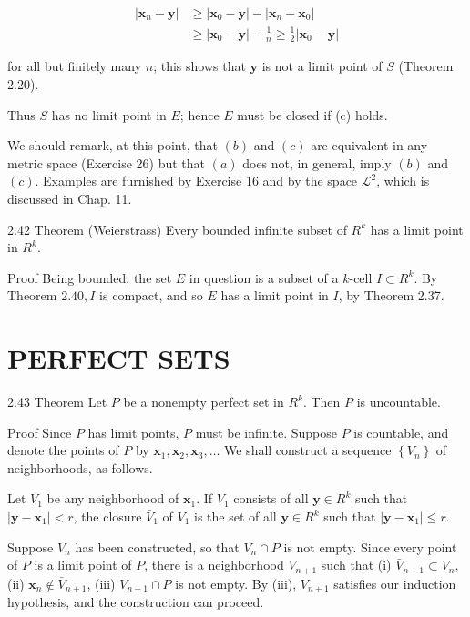 \documentclass[10pt]{article}
\begin{document}
$$
\begin{aligned}
\left|\mathbf{x}_{n}-\mathbf{y}\right| & \geq\left|\mathbf{x}_{0}-\mathbf{y}\right|-\left|\mathbf{x}_{n}-\mathbf{x}_{0}\right| \\
& \geq\left|\mathbf{x}_{0}-\mathbf{y}\right|-\frac{1}{n} \geq \frac{1}{2}\left|\mathbf{x}_{0}-\mathbf{y}\right|
\end{aligned}
$$

for all but finitely many $n$; this shows that $\mathbf{y}$ is not a limit point of $S$ (Theorem 2.20).

Thus $S$ has no limit point in $E$; hence $E$ must be closed if (c) holds.

We should remark, at this point, that $(b)$ and $(c)$ are equivalent in any metric space (Exercise 26) but that $(a)$ does not, in general, imply $(b)$ and $(c)$. Examples are furnished by Exercise 16 and by the space $\mathscr{L}^{2}$, which is discussed in Chap. 11.

2.42 Theorem (Weierstrass) Every bounded infinite subset of $R^{k}$ has a limit point in $R^{k}$.

Proof Being bounded, the set $E$ in question is a subset of a $k$-cell $I \subset R^{k}$. By Theorem $2.40, I$ is compact, and so $E$ has a limit point in $I$, by Theorem 2.37.

\section{PERFECT SETS}
2.43 Theorem Let $P$ be a nonempty perfect set in $R^{k}$. Then $P$ is uncountable.

Proof Since $P$ has limit points, $P$ must be infinite. Suppose $P$ is countable, and denote the points of $P$ by $\mathbf{x}_{1}, \mathbf{x}_{2}, \mathbf{x}_{3}, \ldots$ We shall construct a sequence $\left\{V_{n}\right\}$ of neighborhoods, as follows.

Let $V_{1}$ be any neighborhood of $\mathbf{x}_{1}$. If $V_{1}$ consists of all $\mathbf{y} \in R^{k}$ such that $\left|\mathbf{y}-\mathbf{x}_{1}\right|<r$, the closure $\bar{V}_{1}$ of $V_{1}$ is the set of all $\mathbf{y} \in R^{k}$ such that $\left|\mathbf{y}-\mathbf{x}_{1}\right| \leq r$.

Suppose $V_{n}$ has been constructed, so that $V_{n} \cap P$ is not empty. Since every point of $P$ is a limit point of $P$, there is a neighborhood $V_{n+1}$ such that (i) $\bar{V}_{n+1} \subset V_{n}$, (ii) $\mathbf{x}_{n} \notin \bar{V}_{n+1}$, (iii) $V_{n+1} \cap P$ is not empty. By (iii), $V_{n+1}$ satisfies our induction hypothesis, and the construction can proceed.
\end{document}
